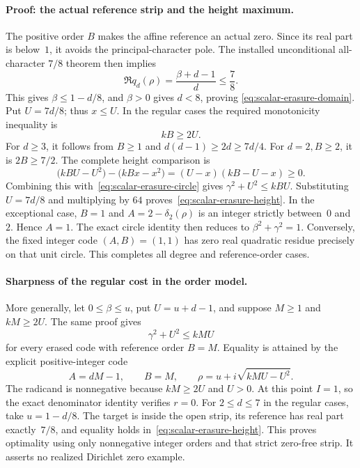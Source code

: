 \paragraph{Proof: the actual reference strip and the height maximum.}
The positive order \(B\) makes the affine reference an actual zero. Since
its real part is below~\(1\), it avoids the principal-character pole. The
installed unconditional all-character \(7/8\) theorem then implies
\[
 \Re q_d(\rho)=\frac{\beta+d-1}{d}\le\frac78.
\]
This gives \(\beta\le1-d/8\), and \(\beta>0\) gives \(d<8\), proving
\eqref{eq:scalar-erasure-domain}. Put \(U=7d/8\); thus \(x\le U\).
In the regular cases the required monotonicity inequality is
\[
 kB\ge2U.
\]
For \(d\ge3\), it follows from \(B\ge1\) and
\(d(d-1)\ge2d\ge7d/4\). For \(d=2,B\ge2\), it is \(2B\ge7/2\).
The complete height comparison is
\[
 \bigl(kBU-U^2\bigr)-\bigl(kBx-x^2\bigr)
   =(U-x)(kB-U-x)\ge0.
\]
Combining this with~\eqref{eq:scalar-erasure-circle} gives
\(\gamma^2+U^2\le kBU\). Substituting \(U=7d/8\) and multiplying by
\(64\) proves~\eqref{eq:scalar-erasure-height}.
In the exceptional case, \(B=1\) and
\(A=2-\delta_2(\rho)\) is an integer strictly between~\(0\) and~\(2\).
Hence \(A=1\). The exact circle identity then reduces to
\(\beta^2+\gamma^2=1\). Conversely, the fixed integer code \((A,B)=(1,1)\)
has zero real quadratic residue precisely on that unit circle. This completes
all degree and reference-order cases.

\paragraph{Sharpness of the regular cost in the order model.}
More generally, let \(0\le\beta\le u\), put \(U=u+d-1\), and suppose
\(M\ge1\) and \(kM\ge2U\). The same proof gives
\[
 \gamma^2+U^2\le kMU
\]
for every erased code with reference order \(B=M\). Equality is attained by
the explicit positive-integer code
\[
 A=dM-1,\qquad B=M,\qquad
 \rho=u+i\sqrt{kMU-U^2}.
\]
The radicand is nonnegative because \(kM\ge2U\) and \(U>0\). At this
point \(I=1\), so the exact denominator identity verifies \(r=0\).
For \(2\le d\le7\) in the regular cases, take \(u=1-d/8\). The target
is inside the open strip, its reference has real part exactly~\(7/8\),
and equality holds in~\eqref{eq:scalar-erasure-height}. This proves
optimality using only nonnegative integer orders and that strict zero-free
strip. It asserts no realized Dirichlet zero example.

